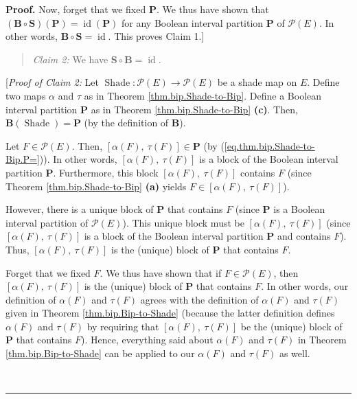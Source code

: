 \documentclass[numbers=enddot,12pt,final,onecolumn]{scrartcl}%
\theoremstyle{definition}
\newenvironment{statement}{\begin{quote}}{\end{quote}}
\newenvironment{proof}[1][Proof]{\noindent\textbf{#1.} }{\ \rule{0.5em}{0.5em}}
\newenvironment{verlong}{}{}
\begin{document}
\begin{verlong}
\begin{proof}
Now, forget that we fixed $\mathbf{P}$. We thus have shown that $\left(
\mathbf{B}\circ\mathbf{S}\right)  \left(  \mathbf{P}\right)
=\operatorname*{id}\left(  \mathbf{P}\right)  $ for any Boolean interval
partition $\mathbf{P}$ of $\mathcal{P}\left(  E\right)  $. In other words,
$\mathbf{B}\circ\mathbf{S}=\operatorname*{id}$. This proves Claim 1.]

\begin{statement}
\textit{Claim 2:} We have $\mathbf{S}\circ\mathbf{B}=\operatorname*{id}$.
\end{statement}

[\textit{Proof of Claim 2:} Let $\operatorname*{Shade}:\mathcal{P}\left(
E\right)  \rightarrow\mathcal{P}\left(  E\right)  $ be a shade map on $E$.
Define two maps $\alpha$ and $\tau$ as in Theorem \ref{thm.bip.Shade-to-Bip}.
Define a Boolean interval partition $\mathbf{P}$ as in Theorem
\ref{thm.bip.Shade-to-Bip} \textbf{(c)}. Then, $\mathbf{B}\left(
\operatorname*{Shade}\right)  =\mathbf{P}$ (by the definition of $\mathbf{B}$).

Let $F\in\mathcal{P}\left(  E\right)  $. Then, $\left[  \alpha\left(
F\right)  ,\ \tau\left(  F\right)  \right]  \in\mathbf{P}$ (by
(\ref{eq.thm.bip.Shade-to-Bip.P=})). In other words, $\left[  \alpha\left(
F\right)  ,\ \tau\left(  F\right)  \right]  $ is a block of the Boolean
interval partition $\mathbf{P}$. Furthermore, this block $\left[
\alpha\left(  F\right)  ,\ \tau\left(  F\right)  \right]  $ contains $F$
(since Theorem \ref{thm.bip.Shade-to-Bip} \textbf{(a)} yields $F\in\left[
\alpha\left(  F\right)  ,\ \tau\left(  F\right)  \right]  $).

However, there is a unique block of $\mathbf{P}$ that contains $F$ (since
$\mathbf{P}$ is a Boolean interval partition of $\mathcal{P}\left(  E\right)
$). This unique block must be $\left[  \alpha\left(  F\right)  ,\ \tau\left(
F\right)  \right]  $ (since $\left[  \alpha\left(  F\right)  ,\ \tau\left(
F\right)  \right]  $ is a block of the Boolean interval partition $\mathbf{P}$
and contains $F$). Thus, $\left[  \alpha\left(  F\right)  ,\ \tau\left(
F\right)  \right]  $ is the (unique) block of $\mathbf{P}$ that contains $F$.

Forget that we fixed $F$. We thus have shown that if $F\in\mathcal{P}\left(
E\right)  $, then $\left[  \alpha\left(  F\right)  ,\ \tau\left(  F\right)
\right]  $ is the (unique) block of $\mathbf{P}$ that contains $F$. In other
words, our definition of $\alpha\left(  F\right)  $ and $\tau\left(  F\right)
$ agrees with the definition of $\alpha\left(  F\right)  $ and $\tau\left(
F\right)  $ given in Theorem \ref{thm.bip.Bip-to-Shade} (because the latter
definition defines $\alpha\left(  F\right)  $ and $\tau\left(  F\right)  $ by
requiring that $\left[  \alpha\left(  F\right)  ,\ \tau\left(  F\right)
\right]  $ be the (unique) block of $\mathbf{P}$ that contains $F$). Hence,
everything said about $\alpha\left(  F\right)  $ and $\tau\left(  F\right)  $
in Theorem \ref{thm.bip.Bip-to-Shade} can be applied to our $\alpha\left(
F\right)  $ and $\tau\left(  F\right)  $ as well.


\end{proof}
\end{verlong}
\end{document}
